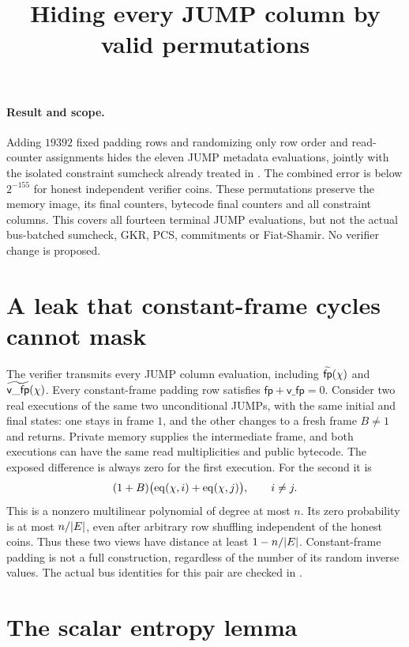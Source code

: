 \documentclass[11pt]{article}
\title{Hiding every JUMP column by valid permutations}
\author{}
\date{}
\begin{document}
\maketitle
\vspace{-2em}

\paragraph{Result and scope.} Adding $19392$ fixed padding rows and randomizing only row order and read-counter assignments hides the eleven JUMP metadata evaluations, jointly with the isolated constraint sumcheck already treated in . The combined error is below $2^{-155}$ for honest independent verifier coins. These permutations preserve the memory image, its final counters, bytecode final counters and all constraint columns. This covers all fourteen terminal JUMP evaluations, but not the actual bus-batched sumcheck, GKR, PCS, commitments or Fiat-Shamir. No verifier change is proposed.

\section{A leak that constant-frame cycles cannot mask}

The verifier transmits every JUMP column evaluation, including $\widetilde{\mathsf{fp}}(\chi)$ and $\widetilde{\mathsf{v\_fp}}(\chi)$. Every constant-frame padding row satisfies $\mathsf{fp}+\mathsf{v\_fp}=0$. Consider two real executions of the same two unconditional JUMPs, with the same initial and final states: one stays in frame $1$, and the other changes to a fresh frame $B\ne1$ and returns. Private memory supplies the intermediate frame, and both executions can have the same read multiplicities and public bytecode. The exposed difference is always zero for the first execution. For the second it is
\[
 (1+B)\bigl(\operatorname{eq}(\chi,i)+\operatorname{eq}(\chi,j)\bigr),\qquad i\ne j.
\]
This is a nonzero multilinear polynomial of degree at most $n$. Its zero probability is at most $n/|E|$, even after arbitrary row shuffling independent of the honest coins. Thus these two views have distance at least $1-n/|E|$. Constant-frame padding is not a full construction, regardless of the number of its random inverse values. The actual bus identities for this pair are checked in .

\section{The scalar entropy lemma}
\end{document}
